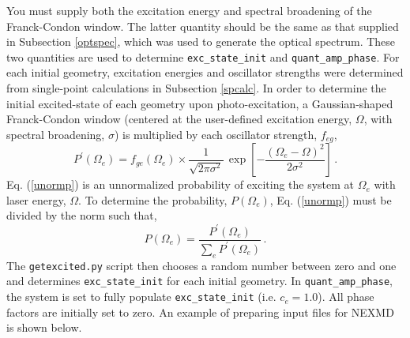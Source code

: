 \documentclass[letterpaper,12pt,titlepage]{article}
\begin{document}
You must supply both the excitation energy and spectral broadening of the Franck-Condon window.  The latter quantity should be the same as that supplied in Subsection \ref{optspec}, which was used to generate the optical spectrum.  These two quantities are used to determine \verb+exc_state_init+ and \verb+quant_amp_phase+.  For each initial geometry, excitation energies and oscillator strengths were determined from single-point calculations in Subsection \ref{spcalc}.  In order to determine the initial excited-state of each geometry upon photo-excitation, a Gaussian-shaped Franck-Condon window (centered at the user-defined excitation energy, $\Omega$, with spectral broadening, $\sigma$) is multiplied by each oscillator strength, $f_{eg}$,
\begin{equation}\label{unormp}
P^{\prime}\left(\Omega_{e}\right) = f_{ge}\left(\Omega_{e}\right)\times\frac{1}{\sqrt{2\pi\sigma^{2}}}\,\exp\left[-\frac{\left(\Omega_{e}-\Omega\right)^{2}}{2\sigma^{2}}\right]\,.
\end{equation}
Eq. (\ref{unormp}) is an unnormalized probability of exciting the system at $\Omega_{e}$ with laser energy, $\Omega$.  To determine the probability, $P\left(\Omega_{e}\right)$, Eq. (\ref{unormp}) must be divided by the norm such that,
\begin{equation}
P\left(\Omega_{e}\right) = \frac{P^{\prime}\left(\Omega_{e}\right)}{\sum_{e} P^{\prime}\left({\Omega_{e}}\right)}\,.
\end{equation}
The \verb+getexcited.py+ script then chooses a random number between zero and one and determines \verb+exc_state_init+ for each initial geometry.  In \verb+quant_amp_phase+, the system is set to fully populate \verb+exc_state_init+ (i.e. $c_{e} = 1.0$).  All phase factors are initially set to zero.  An example of preparing input files for NEXMD is shown below.
\end{document}
